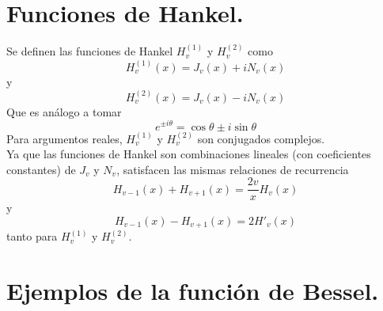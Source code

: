 \section{Funciones de Hankel.}
Se definen las funciones de Hankel $H_{v}^{(1)}$ y $H_{v}^{(2)}$ como
\begin{equation}
H_{v}^{(1)}(x) = J_{v}(x) + i N_{v}(x)
\label{eq:ecuacion_11_85}
\end{equation}
y
\begin{equation}
H_{v}^{(2)}(x) = J_{v}(x) - i N_{v}(x)
\label{eq:ecuacion_11_86}
\end{equation}
Que es análogo a tomar
\begin{equation}
e^{\pm i \theta} =  \cos \theta \pm i \sin \theta
\label{eq:ecuacion_11_87}
\end{equation}
Para argumentos reales, $H_{v}^{(1)}$ y $H_{v}^{(2)}$  son conjugados complejos.
\\
Ya que las funciones de Hankel son combinaciones lineales (con coeficientes constantes) de $J_{v}$ y $N_{v}$, satisfacen las mismas relaciones de recurrencia
\begin{equation}
H_{v-1} (x) + H_{v+1} (x) = \dfrac{2v}{x} H_{v} (x)
\label{eq:ecuacion_11_92}
\end{equation} 
y 
\begin{equation}
H_{v-1} (x) - H_{v+1} (x) = 2 H'_{v} (x)
\label{eq:ecuacion_11_92}
\end{equation} 
tanto para $H_{v}^{(1)}$ y $H_{v}^{(2)}$.
\newpage
\section{Ejemplos de la función de Bessel.}
